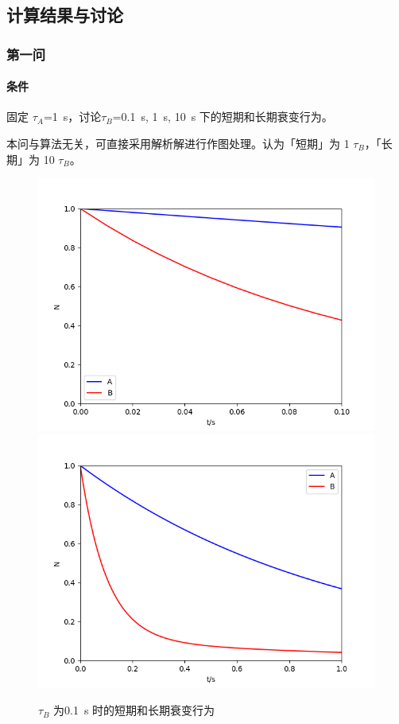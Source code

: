 \documentclass{ctexart}
\begin{document}
\subsection{计算结果与讨论}
\subsubsection{第一问}
\paragraph{条件} 固定 $\tau_A$=1~s，讨论$\tau_B$=0.1~s, 1~s, 10~s 下的短期和长期衰变行为。

本问与算法无关，可直接采用解析解进行作图处理。认为「短期」为 1 $\tau_B$，「长期」为 10 $\tau_B$。

\begin{figure}[h]
\includegraphics[scale = 0.4]{b01_s.png}
\includegraphics[scale = 0.4]{b01_l.png}
\caption{$\tau_B$ 为0.1~s 时的短期和长期衰变行为}
\end{figure}
\end{document}
